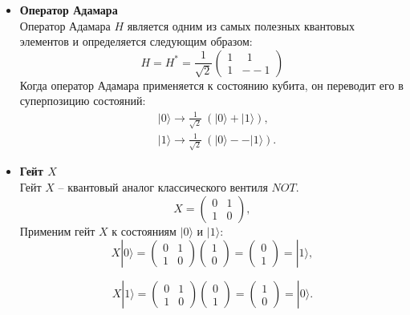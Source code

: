 \documentclass[12pt,a4paper]{article}
\begin{document}
	\begin{itemize}
		\item \textbf{Оператор Адамара} \\
		Оператор Адамара $H$ является одним из самых полезных квантовых элементов и определяется следующим образом:
		\begin{equation}
			H = H^{*} = \frac{1}{\sqrt{2}}
			\begin{pmatrix}
				1 &  ~~1 \\
				1 & --1
			\end{pmatrix}
		\end{equation}
		Когда оператор Адамара применяется к состоянию кубита, он переводит его в суперпозицию состояний:
		\begin{equation}
			\begin{split}
				& | 0 \rangle \rightarrow \frac{1}{\sqrt{2}}~(| 0 \rangle + | 1 \rangle), \\
				& | 1 \rangle \rightarrow \frac{1}{\sqrt{2}}~(| 0 \rangle-- | 1 \rangle).
			\end{split}
		\end{equation}
		\item \textbf{Гейт $X$} \\
		Гейт $X$ -- квантовый аналог классического вентиля $NOT$.
		\begin{equation}
			X = 
			\begin{pmatrix}
				0 & 1 \\
				1 & 0
			\end{pmatrix},
		\end{equation}
		Применим гейт $X$ к состояниям $|0 \rangle$ и $|1 \rangle$:
		\begin{equation}
			X |0 \rangle = 
			\begin{pmatrix}
				0 & 1 \\
				1 & 0
			\end{pmatrix}
			\begin{pmatrix}
				1 \\
				0
			\end{pmatrix}
			=
			\begin{pmatrix}
				0 \\
				1
			\end{pmatrix}
			=  |1 \rangle,
		\end{equation}
		
		\begin{equation}
			X |1 \rangle = 
			\begin{pmatrix}
				0 & 1 \\
				1 & 0
			\end{pmatrix}
			\begin{pmatrix}
				0 \\
				1
			\end{pmatrix}
			=
			\begin{pmatrix}
				1 \\
				0
			\end{pmatrix}
			=  |0 \rangle.
		\end{equation}
		

\end{itemize}
\end{document}
